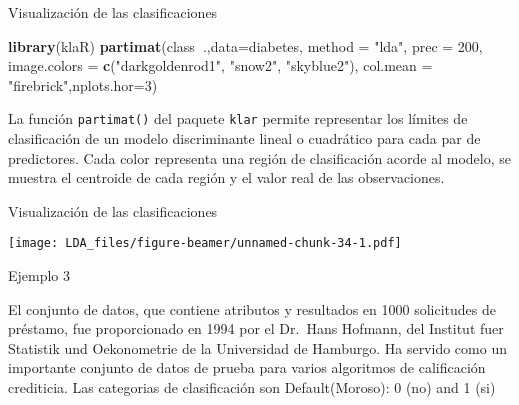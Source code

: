 \documentclass[ignorenonframetext,]{beamer}
\newenvironment{Shaded}{\begin{snugshade}}{\end{snugshade}}
\newcommand{\KeywordTok}[1]{\textcolor[rgb]{0.13,0.29,0.53}{\textbf{#1}}}
\newcommand{\DataTypeTok}[1]{\textcolor[rgb]{0.13,0.29,0.53}{#1}}
\newcommand{\DecValTok}[1]{\textcolor[rgb]{0.00,0.00,0.81}{#1}}
\newcommand{\StringTok}[1]{\textcolor[rgb]{0.31,0.60,0.02}{#1}}
\newcommand{\OperatorTok}[1]{\textcolor[rgb]{0.81,0.36,0.00}{\textbf{#1}}}
\newcommand{\NormalTok}[1]{#1}
\begin{document}
\begin{frame}[fragile]{Visualización de las clasificaciones}

\begin{Shaded}
\begin{Highlighting}[]
\KeywordTok{library}\NormalTok{(klaR)}
\KeywordTok{partimat}\NormalTok{(class}\OperatorTok{~}\NormalTok{.,}\DataTypeTok{data=}\NormalTok{diabetes, }\DataTypeTok{method =} \StringTok{"lda"}\NormalTok{, }\DataTypeTok{prec =} \DecValTok{200}\NormalTok{,}
         \DataTypeTok{image.colors =} \KeywordTok{c}\NormalTok{(}\StringTok{"darkgoldenrod1"}\NormalTok{, }\StringTok{"snow2"}\NormalTok{, }\StringTok{"skyblue2"}\NormalTok{),}
         \DataTypeTok{col.mean =} \StringTok{"firebrick"}\NormalTok{,}\DataTypeTok{nplots.hor=}\DecValTok{3}\NormalTok{)       }
\end{Highlighting}
\end{Shaded}

La función \texttt{partimat()} del paquete \texttt{klar} permite
representar los límites de clasificación de un modelo discriminante
lineal o cuadrático para cada par de predictores. Cada color representa
una región de clasificación acorde al modelo, se muestra el centroide de
cada región y el valor real de las observaciones.

\end{frame}

\begin{frame}{Visualización de las clasificaciones}

\texttt{[image: LDA\_files/figure-beamer/unnamed-chunk-34-1.pdf]}

\end{frame}

\begin{frame}{Ejemplo 3}

El conjunto de datos, que contiene atributos y resultados en 1000
solicitudes de préstamo, fue proporcionado en 1994 por el Dr.~Hans
Hofmann, del Institut fuer Statistik und Oekonometrie de la Universidad
de Hamburgo. Ha servido como un importante conjunto de datos de prueba
para varios algoritmos de calificación crediticia. Las categorias de
clasificación son Default(Moroso): 0 (no) and 1 (si)

\end{frame}
\end{document}
